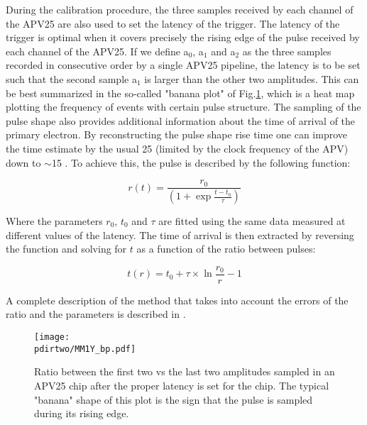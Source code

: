 During the calibration procedure, the three samples received by each channel of the APV25 are also used to set the latency of the trigger. The latency of the trigger is optimal when it covers precisely the rising edge of the pulse received by each channel of the APV25. If we define a$_0$, a$_1$ and a$_2$ as the three samples recorded in consecutive order by a single APV25 pipeline, the latency is to be set such that the second sample a$_1$ is larger than the other two amplitudes. This can be best summarized in the so-called "banana plot" of Fig.\ref{fig:banana-plot}, which is a heat map plotting the frequency of events with certain pulse structure. The sampling of the pulse shape also provides additional information about the time of arrival of the primary electron. By reconstructing the pulse shape rise time one can improve the time estimate by the usual 25 \nas (limited by the clock frequency of the APV) down to $\sim$15 \nas \cite{Banerjee:2017mdu}. To achieve this, the pulse is described by the following function:

\begin{equation}
\label{eq:apv-pulse}
r(t) = \frac{r_0}{(1 + \exp{\frac{t-t_0}{\tau}})}
\end{equation}

Where the parameters $r_0$, $t_0$ and $\tau$ are fitted using the same data measured at different values of the latency. The time of arrival is then extracted by reversing the function and solving for $t$ as a function of the ratio between pulses:

\begin{equation}
\label{eq:2}
t(r) = t_0 + \tau \times \ln{\frac{r_0}{r} - 1}
\end{equation}

A complete description of the method that takes into account the errors of the ratio and the parameters is described in \cite{dbanerjee-thesis}.

\begin{figure}[!bth]
  \centering
  \texttt{[image: \\pdirtwo/MM1Y\_bp.pdf]}
\caption[APV25 banana plot]{Ratio between the first two vs the last two amplitudes sampled in an APV25 chip after the proper latency is set for the chip. The typical "banana" shape of this plot is the sign that the pulse is sampled during its rising edge.}
\label{fig:banana-plot}
\end{figure}

